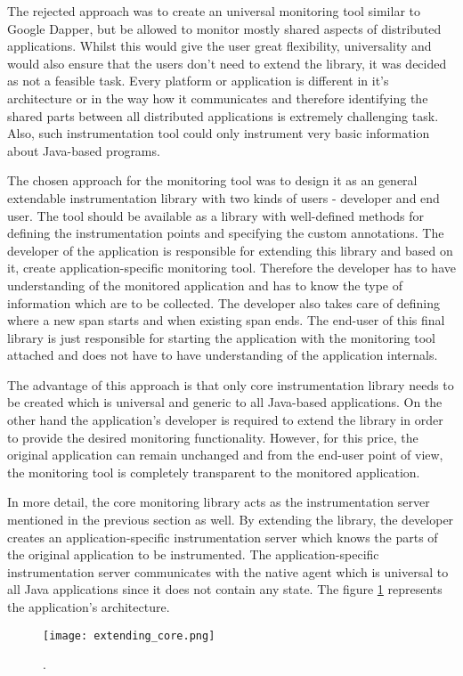 The rejected approach was to create an universal monitoring tool similar to Google Dapper, but be allowed to monitor mostly shared aspects of distributed applications. Whilst this would give the user great flexibility, universality and would also ensure that the users don't need to extend the library, it was decided as not a feasible task. Every platform or application is different in it's architecture or in the way how it communicates and therefore identifying the shared parts between all distributed applications is extremely challenging task. Also, such instrumentation tool could only instrument very basic information about Java-based programs.

The chosen approach for the monitoring tool was to design it as an general extendable instrumentation library with two kinds of users - developer and end user. The tool should be available as a library with well-defined methods for defining the instrumentation points and specifying the custom annotations. The developer of the application is responsible for extending this library and based on it, create application-specific monitoring tool. Therefore the developer has to have understanding of the monitored application and has to know the type of information which are to be collected. The developer  also takes care of defining where a new span starts and when existing span ends. The end-user of this final library is just responsible for starting the application with the monitoring tool attached and does not have to have understanding of the application internals.

The advantage of this approach is that only core instrumentation library needs to be created which is universal and generic to all Java-based applications. On the other hand the application's developer is required to extend the library in order to provide the desired monitoring functionality. However, for this price, the original application can remain unchanged and from the end-user point of view, the monitoring tool is completely transparent to the monitored application.

In more detail, the core monitoring library acts as the instrumentation server mentioned in the previous section as well. By extending the library, the developer creates an application-specific instrumentation server which knows the parts of the original application to be instrumented. The application-specific instrumentation server communicates with the native agent which is universal to all Java applications since it does not contain any state. 
The figure \ref{fig:extending_core} represents the application's architecture.
\begin{figure}
	\centering
	\texttt{[image: extending\_core.png]}
	\caption{.}
	\label{fig:extending_core}
\end{figure}


